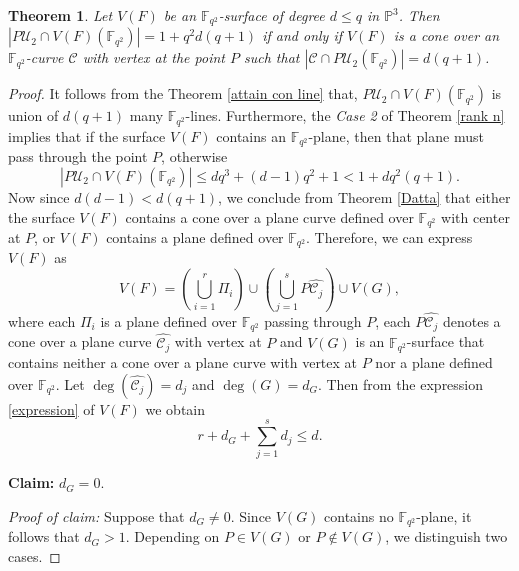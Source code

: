 \documentclass[10pt,a4paper,oneside]{amsproc}
\newtheorem{theorem}{Theorem}[section]
\newcommand{\Fqt}{\mathbb{F}_{q^2}}
\newcommand{\C}{\mathcal{C}}
\newcommand{\U}{\mathcal{U}}
\def\PP{{\mathbb P}}
\begin{document}
\begin{theorem}\label{cofi of V(F)}
   Let $V(F)$ be an $\Fqt$-surface of degree $d\leq q$ in $\PP^3$. Then $|P\U_2\cap V(F)(\Fqt)|=1+q^2d(q+1)$ if and only if $V(F)$ is a cone over an $\Fqt$-curve $\C$ with vertex at the point $P$ such that $|\C\cap P\U_2(\Fqt)|=d(q+1)$.  
\end{theorem}
\begin{proof}
   It follows from the Theorem \ref{attain con line} that, $P\U_2\cap V(F)(\Fqt)$ is union of $d(q+1)$ many $\Fqt$-lines. Furthermore, the \textit{Case 2} of Theorem \ref{rank n} implies that if the surface $V(F)$ contains an $\Fqt$-plane, then that plane must pass through the point $P$, otherwise $$|P\U_2\cap V(F)(\Fqt)|\leq dq^3+(d-1)q^2+1< 1+dq^2(q+1).$$ Now since $d(d-1)<d(q+1)$, we conclude from Theorem \ref{Datta} that either the surface $V(F)$ contains a cone over a plane curve defined over $\Fqt$ with center at $P$, or $V(F)$ contains a plane defined over $\Fqt$. Therefore, we can express $V(F)$ as \begin{equation}\label{expression}
   V(F)=\left(\bigcup_{i=1}^r \Pi_i\right)\cup \left(\bigcup_{j=1}^s P\widehat{\C_j}\right)\cup V(G),
   \end{equation}where each $\Pi_i$ is a plane defined over $\Fqt$ passing through $P$, each $P\widehat{\C_j}$ denotes a cone over a plane curve $\widehat{\C_j}$ with vertex at $P$ and $V(G)$ is an $\Fqt$-surface  that contains neither a cone over a plane curve with vertex at $P$ nor a plane defined over $\Fqt$. Let $\deg(\widehat{\C_j})=d_j$ and $\deg(G)=d_G$. Then from the expression \eqref{expression} of $V(F)$ we obtain \begin{equation}\label{deg inq} r+d_G+\sum_{j=1}^s d_j\leq d.    
   \end{equation}
   
   \textbf{Claim:} $d_G=0$.

  \textit{Proof of claim:} Suppose that $d_G\neq 0$. Since $V(G)$ contains no $\Fqt$-plane, it follows that $d_G>1$. Depending on $P\in V(G)$ or $P\notin V(G)$, we distinguish two cases.


\end{proof}
\end{document}
